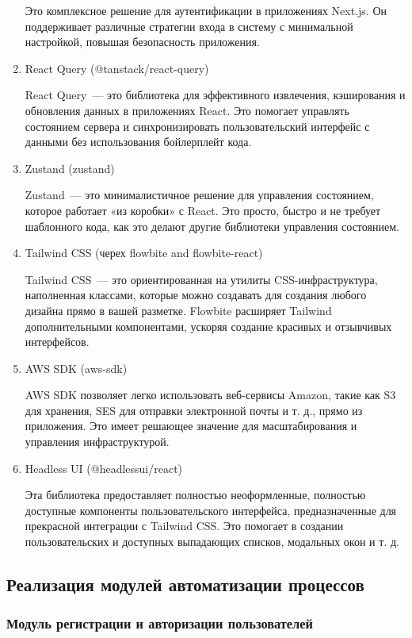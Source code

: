 \begin{enumerate}
	Это комплексное решение для аутентификации в приложениях Next.js. Он поддерживает различные стратегии входа в систему с минимальной настройкой, повышая безопасность приложения.
	
	\item React Query (@tanstack/react-query)
	
	React Query~--- это библиотека для эффективного извлечения, кэширования и обновления данных в приложениях React. Это помогает управлять состоянием сервера и синхронизировать пользовательский интерфейс с данными без использования бойлерплейт кода.
	
	\item Zustand (zustand)
	
	Zustand~--- это минималистичное решение для управления состоянием, которое работает «из коробки» с React. Это просто, быстро и не требует шаблонного кода, как это делают другие библиотеки управления состоянием.
	
	\item Tailwind CSS (черех flowbite and flowbite-react)
	
	Tailwind CSS~--- это ориентированная на утилиты CSS-инфраструктура, наполненная классами, которые можно создавать для создания любого дизайна прямо в вашей разметке. Flowbite расширяет Tailwind дополнительными компонентами, ускоряя создание красивых и отзывчивых интерфейсов.
	
	\item AWS SDK (aws-sdk)
	
	AWS SDK позволяет легко использовать веб-сервисы Amazon, такие как S3 для хранения, SES для отправки электронной почты и т. д., прямо из приложения. Это имеет решающее значение для масштабирования и управления инфраструктурой.
	
	\item Headless UI (@headlessui/react)
	
	Эта библиотека предоставляет полностью неоформленные, полностью доступные компоненты пользовательского интерфейса, предназначенные для прекрасной интеграции с Tailwind CSS. Это помогает в создании пользовательских и доступных выпадающих списков, модальных окон и т. д.
\end{enumerate}

\subsection{Реализация модулей автоматизации процессов}

\subsubsection{Модуль регистрации и авторизации пользователей}

